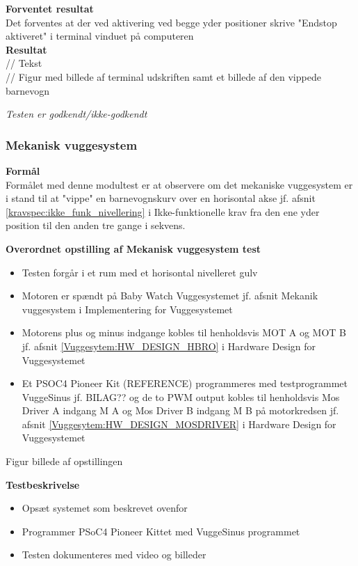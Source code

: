 \textbf{Forventet resultat} \\
Det forventes at der ved aktivering ved begge yder positioner skrive "Endstop aktiveret" i terminal vinduet på computeren \\
\textbf{Resultat} \\
// Tekst \\

// Figur med billede af terminal udskriften samt et billede af den vippede barnevogn

\textit{Testen er godkendt/ikke-godkendt}



\subsubsection{Mekanisk vuggesystem}
\textbf{Formål} \\
Formålet med denne modultest er at observere om det mekaniske vuggesystem er i stand til at "vippe" en barnevognskurv over en horisontal akse jf. afsnit \ref{kravspec:ikke_funk_nivellering} i Ikke-funktionelle krav fra den ene yder position til den anden tre gange i sekvens. 

\textbf{Overordnet opstilling af Mekanisk vuggesystem test}

\begin{itemize}
	\item Testen forgår i et rum med et horisontal nivelleret gulv
	\item Motoren er spændt på Baby Watch Vuggesystemet jf. afsnit Mekanik vuggesystem i Implementering for Vuggesystemet
	\item Motorens plus og minus indgange kobles til henholdsvis MOT A og MOT B jf. afsnit \ref{Vuggesytem:HW_DESIGN_HBRO} i Hardware Design for Vuggesystemet
	\item Et PSOC4 Pioneer Kit (REFERENCE) programmeres med testprogrammet VuggeSinus jf. BILAG?? og de to PWM output kobles til henholdsvis Mos Driver A indgang M A og Mos Driver B indgang M B på motorkredsen jf. afsnit \ref{Vuggesytem:HW_DESIGN_MOSDRIVER} i Hardware Design for Vuggesystemet
\end{itemize}

Figur billede af opstillingen

\textbf{Testbeskrivelse}
\begin{itemize}
	\item Opsæt systemet som beskrevet ovenfor
	\item Programmer PSoC4 Pioneer Kittet med VuggeSinus programmet
	\item Testen dokumenteres med video og billeder
\end{itemize}

